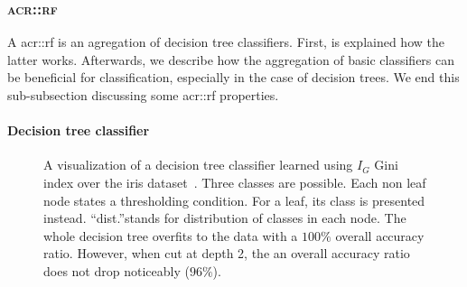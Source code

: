         \subsubsection{\textsc{\acrlong*{acr::rf}}}
            \label{subsubsec::state_of_the_art::mlpr::classifiers::rf}
            A \gls{acr::rf} is an agregation of decision tree classifiers.
            First, is explained how the latter works.
            Afterwards, we describe how the aggregation of basic classifiers can be beneficial for classification, especially in the case of decision trees.
            We end this sub-subsection discussing some \gls{acr::rf} properties.

            \paragraph{Decision tree classifier}
                \begin{figure}[htbp]
                    \centering
                    
                    \caption[
                        A visualization of a decision tree classifier learned using $I_G$ Gini index over the iris dataset.
                    ]{
                        \label{fig::decision_tree_graph}
                        A visualization of a decision tree classifier learned using $I_G$ Gini index over the iris dataset~\parencite{fisher1936use}.
                        Three classes are possible.
                        Each non leaf node states a thresholding condition.
                        For a leaf, its class is presented instead.
                        ``dist.''stands for distribution of classes in each node.
                        The whole decision tree overfits to the data with a $100\%$ overall accuracy ratio.
                        However, when cut at depth 2, the an overall accuracy ratio does not drop noticeably ($96\%$).
                    }
                \end{figure}

